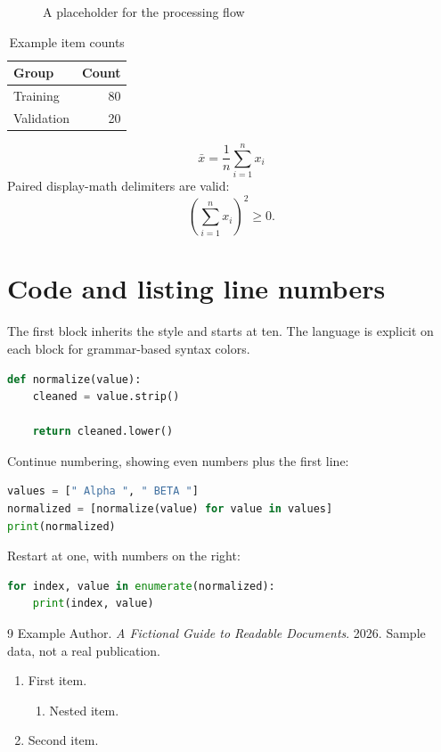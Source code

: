 \documentclass[11pt]{report}
\begin{document}
\begin{figure}[htbp]
  \centering
  \fbox{\rule{0pt}{18mm}\rule{0.65\linewidth}{0pt}}
  \caption{A placeholder for the processing flow}
  \label{fig:flow}
\end{figure}
\begin{table}[htbp]
  \centering
  \caption{Example item counts}
  \label{tab:counts}
  \begin{tabular}{lr}
    Group & Count \\
    \hline
    Training & 80 \\
    Validation & 20 \\
  \end{tabular}
\end{table}
\begin{equation}
  \bar{x} = \frac{1}{n}\sum_{i=1}^{n}x_i
  \label{eq:mean}
\end{equation}
Paired display-math delimiters are valid:
\[
  \left(\sum_{i=1}^{n}x_i\right)^2 \geq 0.
\]

\section{Code and listing line numbers}
\label{sec:code}
The first block inherits the style and starts at ten. The language is explicit
on each block for grammar-based syntax colors.
\begin{lstlisting}[language=Python,firstnumber=10]
def normalize(value):
    cleaned = value.strip()

    return cleaned.lower()
\end{lstlisting}
Continue numbering, showing even numbers plus the first line:
\begin{lstlisting}[language=Python,firstnumber=last,stepnumber=2]
values = [" Alpha ", " BETA "]
normalized = [normalize(value) for value in values]
print(normalized)
\end{lstlisting}
Restart at one, with numbers on the right:
\begin{lstlisting}[language=Python,numbers=right,firstnumber=1]
for index, value in enumerate(normalized):
    print(index, value)
\end{lstlisting}

\begin{thebibliography}{9}
  Example Author. \emph{A Fictional Guide to Readable Documents}. 2026.
  Sample data, not a real publication.
\end{thebibliography}

\begin{enumerate}
  \item First item.\label{item:first}
  \begin{enumerate}
    \item Nested item.
  \end{enumerate}
  \item Second item.
\end{enumerate}
\end{document}
